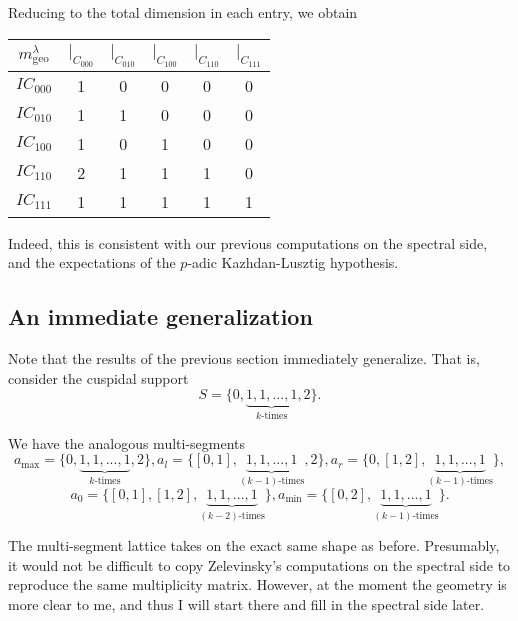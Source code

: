 \documentclass{memoir}
\newcommand{\tx}{\text}
\theoremstyle{definition}
\begin{document}
	Reducing to the total dimension in each entry, we obtain
	\begin{center}
		\begin{tabular}{ c | c c c c c}
			$m_{\tx{geo}}^\lambda$ & $|_{C_{000}}$ & $|_{C_{010}}$ & $|_{C_{100}}$ & $|_{C_{110}}$ & $|_{C_{111}}$ \\
			\hline 
			$IC_{000}$ & 1 & 0 & 0 & 0 & 0\\
			$IC_{010}$ & 1 & 1 & 0 & 0 & 0 \\
			$IC_{100}$ & 1 & 0 & 1 & 0 & 0 \\
			$IC_{110}$ & 2 & 1 & 1 & 1 & 0 \\
			$IC_{111}$ & 1 & 1 & 1 & 1 & 1 
		\end{tabular}
	\end{center}
	
	Indeed, this is consistent with our previous computations on the spectral side, and the expectations of the $p$-adic Kazhdan-Lusztig hypothesis.  
	
	
	
	
	
	
	
	
	
	
	
	
	
	
	
	\subsection{An immediate generalization}  
	
	Note that the results of the previous section immediately generalize.  
	That is, consider the cuspidal support
	$$S=\{0, \underbrace{1, 1, ..., 1}_{\tx{$k$-times}}, 2\}.$$
	
	We have the analogous multi-segments
	$$a_{\tx{max}}=\{0, \underbrace{1, 1, ..., 1}_{\tx{$k$-times}}, 2\}, a_l=\{[0, 1], \underbrace{1, 1, ..., 1}_{\tx{$(k-1)$-times}}, 2\}, a_r=\{0, [1, 2], \underbrace{1, 1, ..., 1}_{\tx{$(k-1)$-times}}\},$$
	$$ a_0=\{[0, 1], [1, 2], \underbrace{1, 1, ..., 1}_{\tx{$(k-2)$-times}}\}, a_{\tx{min}}=\{[0, 2], \underbrace{1, 1, ..., 1}_{\tx{$(k-1)$-times}}\}.$$
	
	The multi-segment lattice takes on the exact same shape as before.  
	Presumably, it would not be difficult to copy Zelevinsky's computations on the spectral side to reproduce the same multiplicity matrix.  
	However, at the moment the geometry is more clear to me, and thus I will start there and fill in the spectral side later. 
	
\end{document}
